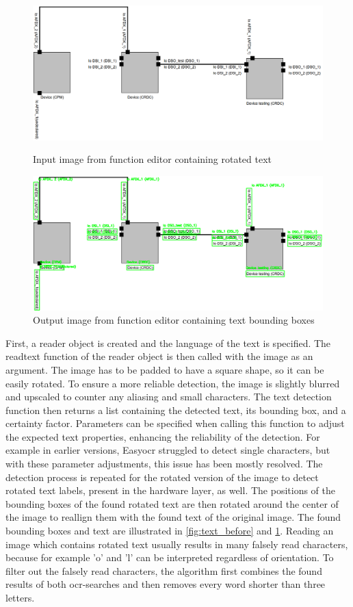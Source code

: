 \begin{figure}[htb]
    \centering
    \includegraphics[width=0.8\linewidth]{pictures/text_before.png}
    \caption{Input image from function editor containing rotated text}
    \label{fig:text_before}

    \centering
    \includegraphics[width=0.8\linewidth]{pictures/text_after.png}
    \caption{Output image from function editor containing text bounding boxes}
    \label{fig:text_after}
\end{figure}
First, a reader object is created and the language of the text is specified. The readtext function of the reader object is then called with the image as an argument. The image has to be padded to have a square shape, so it can be easily rotated. To ensure a more reliable detection, the image is slightly blurred and upscaled to counter any aliasing and small characters. The text detection function then returns a list containing the detected text, its bounding box, and a certainty factor. Parameters can be specified when calling this function to adjust the expected text properties, enhancing the reliability of the detection. For example in earlier versions, Easy\acrshort{ocr} struggled to detect single characters, but with these parameter adjustments, this issue has been mostly resolved. The detection process is repeated for the rotated version of the image to detect rotated text labels, present in the hardware layer, as well. The positions of the bounding boxes of the found rotated text are then rotated around the center of the image to reallign them with the found text of the original image. The found bounding boxes and text are illustrated in \autoref{fig:text_before} and \ref{fig:text_after}. Reading an image which contains rotated text usually results in many falsely read characters, because for example 'o' and 'l' can be interpreted regardless of orientation. To filter out the falsely read characters, the algorithm first combines the found results of both \acrshort{ocr}-searches and then removes every word shorter than three letters.\\

